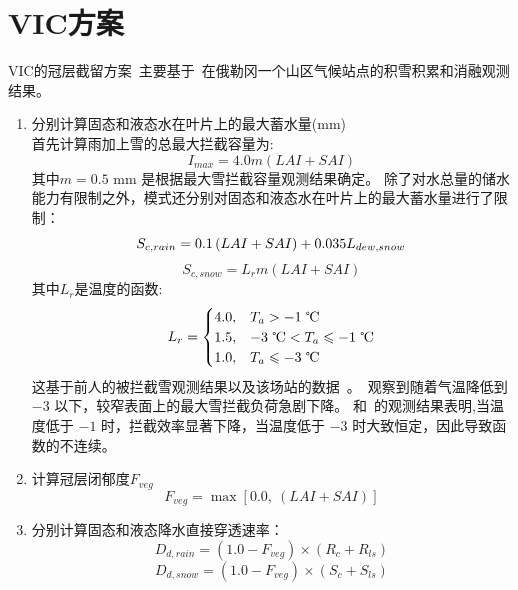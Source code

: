 \section{VIC方案}
VIC的冠层截留方案~\citep{liang1994simple,hamman2018variable}主要基于~\citet{storck2002measurement}在俄勒冈一个山区气候站点的积雪积累和消融观测结果。
\begin{enumerate}
\item 分别计算固态和液态水在叶片上的最大蓄水量(mm)\\
首先计算雨加上雪的总最大拦截容量为:
\begin{equation}
I_{max} = 4.0 m (LAI+SAI)
\end{equation}
其中$m=0.5$ mm 是根据最大雪拦截容量观测结果确定。
除了对水总量的储水能力有限制之外，模式还分别对固态和液态水在叶片上的最大蓄水量进行了限制：
\begin{equation}
S_{c,rain}=0.1\left(LAI+SAI\right)+0.035 L_{dew,snow}\\
\end{equation}
\begin{equation}
S_{c,snow}=L_r m (LAI+SAI)
\end{equation}
其中$L_r$是温度的函数:
\begin{equation}
L_r = \begin{cases}
           4.0, & T_a > -1 \text{ \textcelsius}\\
            1.5, & -3 \text{ \textcelsius} < T_a \leqslant -1 \text{ \textcelsius}\\
           1.0, & T_a \leqslant -3 \text{ \textcelsius}
         \end{cases}
\end{equation}
这基于前人的被拦截雪观测结果以及该场站的数据~\citep{storck2002measurement}。\citet{kobayashi1987snow}~观察到随着气温降低到 $-3$ \textcelsius 以下，较窄表面上的最大雪拦截负荷急剧下降。 \citet{kobayashi1987snow}和~\citet{pfister1999snow}的观测结果表明,当温度低于 $-1$ \textcelsius 时，拦截效率显著下降，当温度低于 $-3$ \textcelsius 时大致恒定，因此导致函数的不连续。

\item 计算冠层闭郁度$F_{veg}$
\begin{equation}
F_{veg} = \max\left[0.0,\ (LAI+SAI)\right]
\end{equation}

\item 分别计算固态和液态降水直接穿透速率：
\begin{equation}
D_{d,rain}=\left(1.0-F_{veg}\right) \times (R_{c}+R_{ls})
\end{equation}
\begin{equation}
D_{d,snow}=\left(1.0-F_{veg}\right) \times (S_{c}+S_{ls})
\end{equation}


\end{enumerate}

